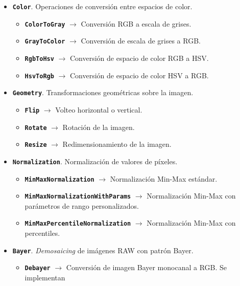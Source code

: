 \begin{itemize}[noitemsep]
    \vspace{0.15cm}
    \item \texttt{\textbf{Color}}. Operaciones de conversión entre espacios de color.
    \begin{itemize}[noitemsep]
        \item \texttt{\textbf{ColorToGray}} $\rightarrow$ Conversión RGB a escala de grises.
        \item \texttt{\textbf{GrayToColor}} $\rightarrow$ Conversión de escala de grises a RGB.
        \item \texttt{\textbf{RgbToHsv}} $\rightarrow$ Conversión de espacio de color RGB a HSV.
        \item \texttt{\textbf{HsvToRgb}} $\rightarrow$ Conversión de espacio de color HSV a RGB.
    \end{itemize}
    \vspace{0.15cm}
    \item \texttt{\textbf{Geometry}}. Transformaciones geométricas sobre la imagen.
    \begin{itemize}[noitemsep]
        \item \texttt{\textbf{Flip}} $\rightarrow$ Volteo horizontal o vertical.
        \item \texttt{\textbf{Rotate}} $\rightarrow$ Rotación de la imagen.
        \item \texttt{\textbf{Resize}} $\rightarrow$ Redimensionamiento de la imagen.
    \end{itemize}
    \vspace{0.15cm}
    \item \texttt{\textbf{Normalization}}. Normalización de valores de píxeles.
    \begin{itemize}[noitemsep]
        \item \texttt{\textbf{MinMaxNormalization}} $\rightarrow$ Normalización Min-Max estándar.
        \item \texttt{\textbf{MinMaxNormalizationWithParams}} $\rightarrow$ Normalización Min-Max con parámetros de rango personalizados.
        \item \texttt{\textbf{MinMaxPercentileNormalization}} $\rightarrow$ Normalización Min-Max con percentiles.
    \end{itemize}
    \vspace{0.15cm}
    \item \texttt{\textbf{Bayer}}. \textit{Demosaicing} de imágenes RAW con patrón Bayer.
    \begin{itemize}[noitemsep]
        \item \texttt{\textbf{Debayer}} $\rightarrow$ Conversión de imagen Bayer monocanal a RGB. Se implementan 

\end{itemize}
\end{itemize}

